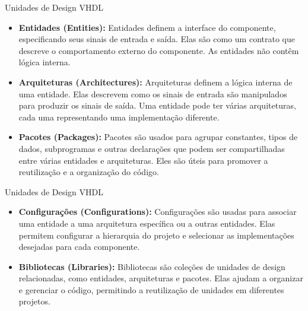 \documentclass[aspectratio=169]{beamer}
\begin{document}
\begin{frame}{Unidades de Design VHDL}
	\justifying
	
	\begin{itemize}
		\justifying
		\item \textbf{Entidades (Entities):} Entidades definem a interface do componente, especificando seus sinais de entrada e saída. Elas são como um contrato que descreve o comportamento externo do componente. As entidades não contêm lógica interna.
		
		\item \textbf{Arquiteturas (Architectures):} Arquiteturas definem a lógica interna de uma entidade. Elas descrevem como os sinais de entrada são manipulados para produzir os sinais de saída. Uma entidade pode ter várias arquiteturas, cada uma representando uma implementação diferente.
		
		\item \textbf{Pacotes (Packages):} Pacotes são usados para agrupar constantes, tipos de dados, subprogramas e outras declarações que podem ser compartilhadas entre várias entidades e arquiteturas. Eles são úteis para promover a reutilização e a organização do código.
		
		

	\end{itemize}
	
	
\end{frame}

\begin{frame}{Unidades de Design VHDL}
	\justifying
	
	\begin{itemize}
		\justifying

		
		\item \textbf{Configurações (Configurations):} Configurações são usadas para associar uma entidade a uma arquitetura específica ou a outras entidades. Elas permitem configurar a hierarquia do projeto e selecionar as implementações desejadas para cada componente.
		
		\item \textbf{Bibliotecas (Libraries):} Bibliotecas são coleções de unidades de design relacionadas, como entidades, arquiteturas e pacotes. Elas ajudam a organizar e gerenciar o código, permitindo a reutilização de unidades em diferentes projetos.
		
		
	\end{itemize}
	
	
\end{frame}
\end{document}
